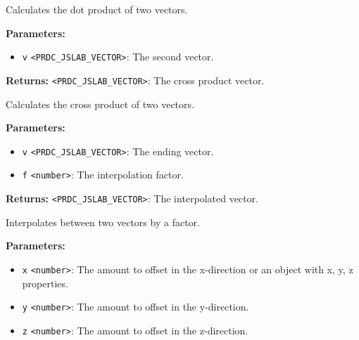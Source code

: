 \documentclass[12pt,a4paper]{article}
\begin{document}
\noindent Calculates the dot product of two vectors.

\vspace{5mm}
\noindent {}


\noindent \textbf{Parameters:}
\begin{itemize}
  \item \texttt{v} \texttt{<PRDC\_JSLAB\_VECTOR>}: The second vector.
\end{itemize}

\noindent \textbf{Returns:} \texttt{<PRDC\_JSLAB\_VECTOR>}: The cross product vector.

\noindent Calculates the cross product of two vectors.

\vspace{5mm}
\noindent {}


\noindent \textbf{Parameters:}
\begin{itemize}
  \item \texttt{v} \texttt{<PRDC\_JSLAB\_VECTOR>}: The ending vector.
  \item \texttt{f} \texttt{<number>}: The interpolation factor.
\end{itemize}

\noindent \textbf{Returns:} \texttt{<PRDC\_JSLAB\_VECTOR>}: The interpolated vector.

\noindent Interpolates between two vectors by a factor.

\vspace{5mm}
\noindent {}


\noindent \textbf{Parameters:}
\begin{itemize}
  \item \texttt{x} \texttt{<number>}: The amount to offset in the x-direction or an object with x, y, z properties.
  \item \texttt{y} \texttt{<number>}: The amount to offset in the y-direction.
  \item \texttt{z} \texttt{<number>}: The amount to offset in the z-direction.
\end{itemize}
\end{document}
